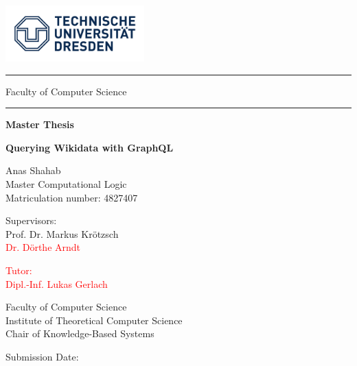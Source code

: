 \begin{titlepage}

	\begin{doublespace}

 
			\includegraphics[width=0.4\textwidth]{logo.jpg}

			\hrule
			\vspace*{0.20cm}
			{\Large Faculty of Computer Science}
			\vspace*{0.15cm}
			\hrule

        		\vspace{1cm}      
        
       		{\LARGE \textbf{Master Thesis} }
            
        		\vspace{0.5cm}
        
        		{\Large \textbf{Querying Wikidata with GraphQL} 
			}
            
        		\vspace{2cm}
        
        
        
			Anas Shahab \\
    			Master Computational Logic \\
    			Matriculation number: 4827407
    		
    			\vspace{1cm}
    		
    			Supervisors: \\
	    		Prof. Dr. Markus Kr{\"otzsch} \\
    			\textcolor{red}{Dr. Dörthe Arndt}
    			\vspace{0.5cm}
    		
    			\textcolor{red}{Tutor: \\
    			Dipl.-Inf. Lukas Gerlach}
    		
    			\vspace{0.5cm}
    		
    			Faculty of Computer Science \\
    			Institute of Theoretical Computer Science \\
    			Chair of Knowledge-Based Systems
    		
    			\vspace{1cm}
    		
    			Submission Date:
    			
                  
	\end{doublespace}
	
            
\end{titlepage}